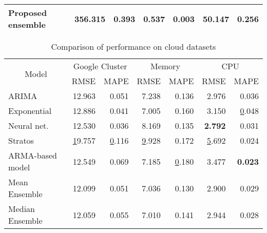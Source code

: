 \begin{table}[]
\begin{tabular}{|l|l|r|r|r|r|r|}
Proposed ensemble                                     & \textbf{356.315}        & \textbf{0.393} & 0.537 & \textbf{0.003} &  50.147 & 0.256 \\ \hline
\end{tabular}
\end{table}

\begin{table}[]
\centering
\caption{Comparison of performance on cloud datasets}
\begin{tabular}{|l|r|r|r|r|r|r|}
\hline
\multicolumn{1}{|c|}{\multirow{2}{*}{Model}} & \multicolumn{2}{c|}{Google Cluster}                   & \multicolumn{2}{c|}{Memory}                              & \multicolumn{2}{c|}{CPU}                              \\ \cline{2-7} 
\multicolumn{1}{|c|}{}                       & \multicolumn{1}{c|}{RMSE} & \multicolumn{1}{c|}{MAPE} & \multicolumn{1}{c|}{RMSE} & \multicolumn{1}{c|}{MAPE} & \multicolumn{1}{c|}{RMSE} & \multicolumn{1}{c|}{MAPE} \\ \hline
ARIMA                                        & 12.963                    & 0.051                     & 7.238                     & 0.136                     & 2.976                     & 0.036                     \\ \hline
Exponential                                  & 12.886                    & 0.041                     & 7.005                     & 0.160                     & 3.150                     & {\ul 0.048}               \\ \hline
Neural net.                                  & 12.530                    & 0.036                     & 8.169                     & 0.135                     & \textbf{2.792}            & 0.031                     \\ \hline
Stratos                                      & {\ul 19.757}              & {\ul 0.116}               & {\ul 9.928}               & 0.172               & {\ul 5.692}               & 0.024            \\ \hline

ARMA-based model                                      & 12.549              & 0.069               & 7.185               & {\ul 0.180}               & 3.477               & \textbf{0.023}            \\ \hline

Mean Ensemble                                      & 12.099              & 0.051               & 7.036               & 0.130               & 2.900               & 0.029            \\ \hline
Median Ensemble                                      &  12.059              & 0.055               &  7.010               & 0.141               & 2.944               & 0.028            \\ \hline


\end{tabular}
\end{table}
